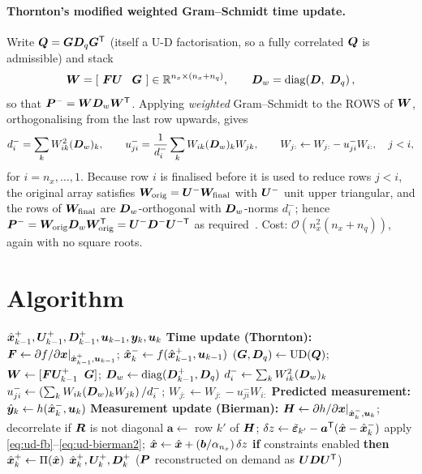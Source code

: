 \paragraph{Thornton's modified weighted Gram--Schmidt time update.} Write
$\bm{Q} = \bm{G}\bm{D}_q\bm{G}^{\mathsf{T}}$ (itself a U-D factorisation, so a fully correlated $\bm{Q}$ is admissible)
and stack
\begin{equation}
\bm{W} = \left[\ \bm{F}\bm{U} \;\;\; \bm{G}\ \right] \in \mathbb{R}^{n_x\times(n_x+n_q)}, \qquad
\bm{D}_w = \operatorname{diag}\!\left(\bm{D},\ \bm{D}_q\right),
\label{eq:ud-thornton-setup}
\end{equation}
so that $\bm{P}^{-} = \bm{W}\bm{D}_w\bm{W}^{\mathsf{T}}$. Applying \emph{weighted} Gram--Schmidt to the ROWS of
$\bm{W}$, orthogonalising from the last row upwards, gives
\begin{equation}
d^-_i = \sum_k W_{ik}^2 (\bm{D}_w)_k, \qquad
u^-_{ji} = \frac{1}{d^-_i}\sum_k W_{ik}(\bm{D}_w)_k W_{jk}, \qquad
W_{j:} \leftarrow W_{j:} - u^-_{ji}W_{i:}, \quad j<i,
\label{eq:ud-thornton}
\end{equation}
for $i = n_x,\dots,1$. Because row $i$ is finalised before it is used to reduce rows $j<i$,
the original array satisfies $\bm{W}_{\text{orig}} = \bm{U}^-\bm{W}_{\text{final}}$ with
$\bm{U}^-$ unit upper triangular, and the rows of $\bm{W}_{\text{final}}$ are $\bm{D}_w$-orthogonal
with $\bm{D}_w$-norms $d^-_i$; hence
$\bm{P}^{-} = \bm{W}_{\text{orig}}\bm{D}_w\bm{W}_{\text{orig}}^{\mathsf{T}} = \bm{U}^-\bm{D}^-\bm{U}^{-\mathsf{T}}$ as
required~\cite{thornton1976ud}. Cost: $\mathcal{O}(n_x^2(n_x+n_q))$, again with no square
roots.

\section{Algorithm}
\begin{algorithm}[H]
\caption{UD-EKF (Bierman--Thornton) --- one sampling period}
\begin{algorithmic}[1]
\Require $\hat{\bm{x}}^{+}_{k-1},\bm{U}^+_{k-1},\bm{D}^+_{k-1},\bm{u}_{k-1},\bm{y}_k,\bm{u}_k$
\State \textbf{Time update (Thornton):} $\bm{F}\gets\partial f/\partial\bm{x}|_{\hat{\bm{x}}^{+}_{k-1},\bm{u}_{k-1}}$;\;
       $\hat{\bm{x}}^{-}_k\gets f(\hat{\bm{x}}^{+}_{k-1},\bm{u}_{k-1})$
\State $(\bm{G},\bm{D}_q)\gets\text{UD}(\bm{Q})$;\;
       $\bm{W}\gets[\bm{F}\bm{U}^+_{k-1}\;\;\bm{G}]$;\; $\bm{D}_w\gets\operatorname{diag}(\bm{D}^+_{k-1},\bm{D}_q)$
  \State $d^-_i\gets\sum_k W_{ik}^2(\bm{D}_w)_k$
    \State $u^-_{ji}\gets\left(\sum_k W_{ik}(\bm{D}_w)_kW_{jk}\right)/d^-_i$;\;
           $W_{j:}\gets W_{j:}-u^-_{ji}W_{i:}$
  \EndFor
\EndFor
\State \textbf{Predicted measurement:} $\hat{\bm{y}}_k\gets h(\hat{\bm{x}}^{-}_k,\bm{u}_k)$
\State \textbf{Measurement update (Bierman):} $\bm{H}\gets\partial h/\partial\bm{x}|_{\hat{\bm{x}}^{-}_k,\bm{u}_k}$;\;
       decorrelate if $\bm{R}$ is not diagonal
  \State $\bm a\gets$ row $k'$ of $\bm{H}$;\; $\delta z\gets\tilde{\bm{\varepsilon}}_{k'}-\bm a^{\mathsf{T}}(\hat{\bm{x}}-\hat{\bm{x}}^{-}_k)$
  \State apply \eqref{eq:ud-fb}--\eqref{eq:ud-bierman2};\;
         $\hat{\bm{x}}\gets\hat{\bm{x}}+(\bm b/\alpha_{n_x})\,\delta z$
\EndFor
\State \textbf{if} constraints enabled \textbf{then} $\hat{\bm{x}}^{+}_k\gets\Pi(\hat{\bm{x}})$
\Ensure $\hat{\bm{x}}^{+}_k,\bm{U}^+_k,\bm{D}^+_k$ \quad ($\bm{P}$ reconstructed on demand as $\bm{U}\bm{D}\bm{U}^{\mathsf{T}}$)
\end{algorithmic}
\end{algorithm}

